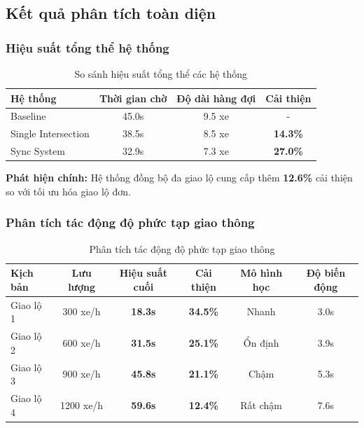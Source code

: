 \subsection{Kết quả phân tích toàn diện}

\subsubsection{Hiệu suất tổng thể hệ thống}

\begin{table}[!htp]
    \centering
    \caption{So sánh hiệu suất tổng thể các hệ thống}
    \label{tab:overall_system_performance}
    \begin{tabular}{@{}lccc@{}}
        \toprule 
        \textbf{Hệ thống} & \textbf{Thời gian chờ} & \textbf{Độ dài hàng đợi} & \textbf{Cải thiện} \\
        \midrule 
        Baseline & 45.0s & 9.5 xe & - \\
        Single Intersection & 38.5s & 8.5 xe & \textbf{14.3\%} \\
        Sync System & 32.9s & 7.3 xe & \textbf{27.0\%} \\
        \bottomrule
    \end{tabular}
\end{table}

\textbf{Phát hiện chính:} Hệ thống đồng bộ đa giao lộ cung cấp thêm \textbf{12.6\%} 
cải thiện so với tối ưu hóa giao lộ đơn.

\subsubsection{Phân tích tác động độ phức tạp giao thông}

\begin{table}[!htp]
    \centering
    \caption{Phân tích tác động độ phức tạp giao thông}
    \label{tab:traffic_complexity_analysis}
    \begin{tabular}{@{}lccccc@{}}
        \toprule 
        \textbf{Kịch bản} & \textbf{Lưu lượng} & \textbf{Hiệu suất cuối} & \textbf{Cải thiện} & \textbf{Mô hình học} & \textbf{Độ biến động} \\
        \midrule 
        Giao lộ 1 & 300 xe/h & \textbf{18.3s} & \textbf{34.5\%} & Nhanh & 3.0s \\
        Giao lộ 2 & 600 xe/h & \textbf{31.5s} & \textbf{25.1\%} & Ổn định & 3.9s \\
        Giao lộ 3 & 900 xe/h & \textbf{45.8s} & \textbf{21.1\%} & Chậm & 5.3s \\
        Giao lộ 4 & 1200 xe/h & \textbf{59.6s} & \textbf{12.4\%} & Rất chậm & 7.6s \\
        \bottomrule
    \end{tabular}
\end{table}

